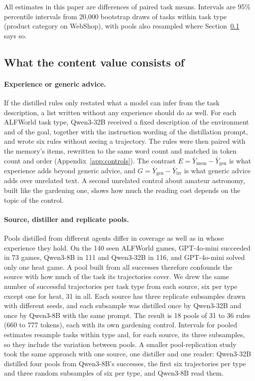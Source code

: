 All estimates in this paper are differences of paired task means. Intervals are 95\% percentile
intervals from 20,000 bootstrap draws of tasks within task type (product category on WebShop), with
pools also resampled where Section~\ref{sec:crossover} says so.

\subsection{What the content value consists of}
\label{sec:crossover}

\paragraph{Experience or generic advice.} If the distilled rules only restated what a model can infer
from the task description, a list written without any experience should do as well. For each ALFWorld
task type, Qwen3-32B received a fixed description of the environment and of the goal, together with the
instruction wording of the distillation prompt, and wrote six rules without seeing a trajectory. The
rules were then paired with the memory's items, rewritten to the same word count and matched in token
count and order (Appendix~\ref{app:controls}). The contrast
$E=\bar Y_{\text{mem}}-\bar Y_{\text{gen}}$ is what experience adds beyond generic advice, and
$G=\bar Y_{\text{gen}}-\bar Y_{\text{irr}}$ is what generic advice adds over unrelated text. A second
unrelated control about amateur astronomy, built like the gardening one, shows how much the reading
cost depends on the topic of the control.

\paragraph{Source, distiller and replicate pools.} Pools distilled from different agents differ in
coverage as well as in whose experience they hold. On the 140 seen ALFWorld games, GPT-4o-mini succeeded
in 73 games, Qwen3-8B in 111 and Qwen3-32B in 116, and GPT-4o-mini solved only one heat game. A pool
built from all successes therefore confounds the source with how much of the task its trajectories
cover. We drew the same number of successful trajectories per task type from each source, six per type
except one for heat, 31 in all. Each source has three replicate subsamples drawn with different seeds,
and each subsample was distilled once by Qwen3-32B and once by Qwen3-8B with the same prompt. The result
is 18 pools of 31 to 36 rules (660 to 777 tokens), each with its own gardening control. Intervals for
pooled estimates resample tasks within type and, for each source, its three subsamples, so they include
the variation between pools. A smaller pool-replication study took the same approach with one source,
one distiller and one reader: Qwen3-32B distilled four pools from Qwen3-8B's successes, the first six
trajectories per type and three random subsamples of six per type, and Qwen3-8B read them.

